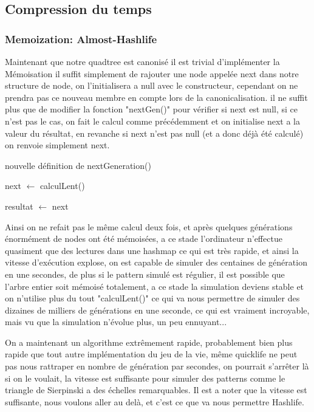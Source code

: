 \subsection{Compression du temps}
\subsubsection{Memoization: Almost-Hashlife}
Maintenant que notre quadtree est canonisé il est trivial d'implémenter la Mémoisation il suffit simplement de rajouter une node appelée next dans notre structure de node, on l'initialisera a null avec le constructeur, cependant on ne prendra pas ce nouveau membre en compte lors de la canonicalisation.
il ne suffit plus que de modifier la fonction "nextGen()" pour vérifier si next est null, si ce n'est pas le cas, on fait le calcul comme précédemment et on initialise next a la valeur du résultat, en revanche si next n'est pas null (et a donc déjà été calculé) on renvoie simplement next.

\begin{algorithm}
\tiny
\caption{nouvelle définition de nextGeneration()}\label{alg:two}
{
    next $\gets$ calculLent()\;
}

resultat $\gets$ next\;
\normalsize
\end{algorithm}

Ainsi on ne refait pas le même calcul deux fois, et après quelques générations énormément de nodes ont été mémoisées, a ce stade l'ordinateur n'effectue quasiment que des lectures dans une hashmap ce qui est très rapide, et ainsi la vitesse d'exécution explose, on est capable de simuler des centaines de génération en une secondes, de plus si le pattern simulé est régulier, il est possible que l'arbre entier soit mémoisé totalement, a ce stade la simulation deviens stable et on n'utilise plus du tout "calculLent()" ce qui va nous permettre de simuler des dizaines de milliers de générations en une seconde, ce qui est vraiment incroyable, mais vu que la simulation n'évolue plus, un peu ennuyant...

On a maintenant un algorithme extrêmement rapide, probablement bien plus rapide que tout autre implémentation du jeu de la vie, même quicklife ne peut pas nous rattraper en nombre de génération par secondes, on pourrait s'arrêter là si on le voulait, la vitesse est suffisante pour simuler des patterns comme le triangle de Sierpinski a des échelles remarquables. Il est a noter que la vitesse est suffisante, nous voulons aller au delà, et c'est ce que va nous permettre Hashlife.

